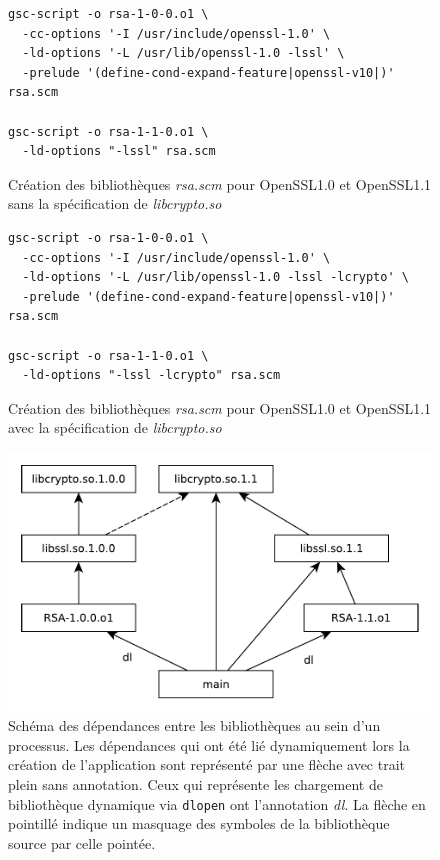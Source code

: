 \begin{center}
\begin{figure}[ht]
\begin{lstlisting}[frame=single]
gsc-script -o rsa-1-0-0.o1 \
  -cc-options '-I /usr/include/openssl-1.0' \
  -ld-options '-L /usr/lib/openssl-1.0 -lssl' \
  -prelude '(define-cond-expand-feature|openssl-v10|)' rsa.scm

gsc-script -o rsa-1-1-0.o1 \
  -ld-options "-lssl" rsa.scm
\end{lstlisting}
\caption{Création des bibliothèques \textit{rsa.scm} pour OpenSSL1.0 et OpenSSL1.1
sans la spécification de \textit{libcrypto.so}}
\label{fig:scm_masq1}
\end{figure}
\end{center}

\begin{center}
\begin{figure}[ht]
\begin{lstlisting}[frame=single]
gsc-script -o rsa-1-0-0.o1 \
  -cc-options '-I /usr/include/openssl-1.0' \
  -ld-options '-L /usr/lib/openssl-1.0 -lssl -lcrypto' \
  -prelude '(define-cond-expand-feature|openssl-v10|)' rsa.scm

gsc-script -o rsa-1-1-0.o1 \
  -ld-options "-lssl -lcrypto" rsa.scm
\end{lstlisting}
\caption{Création des bibliothèques \textit{rsa.scm} pour OpenSSL1.0 et OpenSSL1.1
avec la spécification de \textit{libcrypto.so}}
\label{fig:scm_masq_fix1}
\end{figure}
\end{center}

\begin{center}
\begin{figure}[ht]
\includegraphics{figures/libssl_masking.pdf}
\caption{Schéma des dépendances entre les bibliothèques au sein d'un processus.
Les dépendances qui ont été lié dynamiquement lors la création de l'application sont représenté par une flèche avec
trait plein sans annotation. Ceux qui représente les chargement de bibliothèque dynamique via \texttt{dlopen} ont
l'annotation \textit{dl}. La flèche en pointillé indique un masquage des symboles de la bibliothèque
source par celle pointée.}
\label{fig:scm_masq_schema}
\end{figure}
\end{center}

